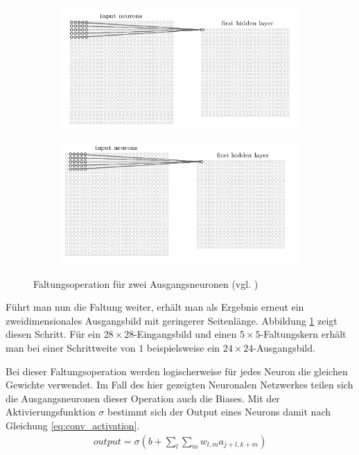 \documentclass[../main.tex]{subfiles}
\begin{document}
\begin{figure}[!htbp]
	\centering
	\begin{subfigure}{0.5\textwidth}
		\centering
		\includegraphics[width=0.8\linewidth]{../images/Riedle/Convolution_2_1}
	\end{subfigure}%
	\begin{subfigure}{0.5\textwidth}
		\centering
		\includegraphics[width=0.8\linewidth]{../images/Riedle/Convolution_2_2}
	\end{subfigure}
	\caption{Faltungsoperation für zwei Ausgangsneuronen (vgl. \cite{NNADL_PIC_CONV_1})} \label{fig:conv_2}
\end{figure}
Führt man nun die Faltung weiter, erhält man als Ergebnis erneut ein zweidimensionales Ausgangsbild mit geringerer Seitenlänge. Abbildung \ref{fig:conv_2} zeigt diesen Schritt. Für ein $28\times28$-Eingangsbild und einen $5\times5$-Faltungskern erhält man bei einer Schrittweite von $1$ beispielsweise ein $24\times24$-Ausgangsbild. \par 
Bei dieser Faltungsoperation werden logischerweise für jedes Neuron die gleichen Gewichte verwendet. Im Fall des hier gezeigten Neuronalen Netzwerkes teilen sich die Ausgangsneuronen dieser Operation auch die Biases. Mit der Aktivierungsfunktion $\sigma$ bestimmt sich der Output eines Neurons damit nach Gleichung \ref{eq:conv_activation}.
\begin{align}\label{eq:con_activation}
	output = \sigma(b+ \sum\limits_l\sum\limits_m w_{l,m}a_{j+l,k+m})
\end{align} \par
\end{document}
